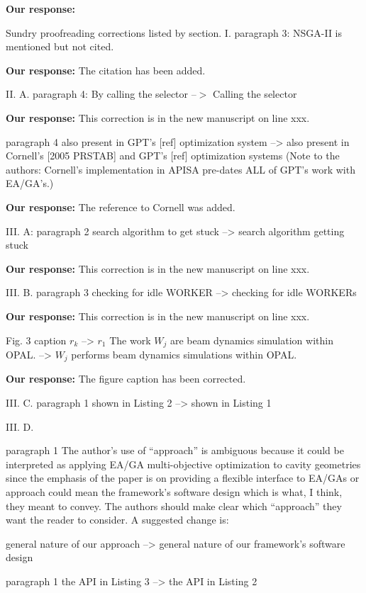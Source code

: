 \documentclass{article}
\begin{document}
{\bf Our response:} {\color{blue} }




Sundry proofreading corrections listed by section.
I. paragraph 3: NSGA-II is mentioned but not cited.

{\bf Our response:} {\color{blue} The citation has been added.}


II. A. paragraph 4: By calling the selector --$>$ Calling the selector

{\bf Our response:} {\color{blue} This correction is in the new manuscript on line xxx.}

paragraph 4
also present in GPT's [ref] optimization system --> also
present in Cornell's [2005 PRSTAB] and GPT's [ref] optimization systems
(Note to the authors: Cornell's implementation in APISA pre-dates ALL
of GPT's work with EA/GA's.)

{\bf Our response:} {\color{blue} The reference to Cornell was added.}

III. A: paragraph 2
search algorithm to get stuck --> search algorithm getting
stuck

{\bf Our response:} {\color{blue} This correction is in the new manuscript on line xxx.}

III. B. paragraph 3
checking for idle WORKER --> checking for idle WORKERs

{\bf Our response:} {\color{blue} This correction is in the new manuscript on line xxx.}

Fig. 3 caption
$r_k$ --> $r_1$
The work $W_j$ are beam dynamics simulation within OPAL.
--> $W_j$ performs beam dynamics simulations within OPAL.

{\bf Our response:} {\color{blue} The figure caption has been corrected.}

III. C. paragraph 1
shown in Listing 2 --> shown in Listing 1

III. D.

paragraph 1
The author's use of ``approach'' is ambiguous because it could be
interpreted as applying EA/GA multi-objective optimization to cavity
geometries since the emphasis of the paper is on providing a flexible
interface to EA/GAs or approach could mean the framework's software
design which is what, I think, they meant to convey. The authors
should make clear which ``approach'' they want the reader to consider.
A suggested change is:

general nature of our approach --> general nature of our
framework's software design

paragraph 1
the API in Listing 3 --> the API in Listing 2
\end{document}
